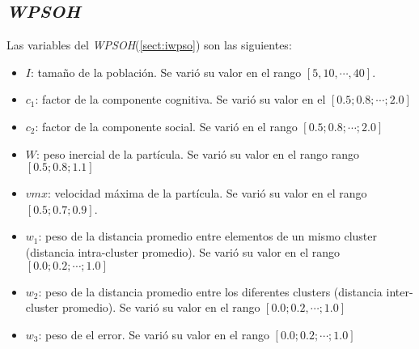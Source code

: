         
        
        

        
        
        

    \subsection{\emph{WPSOH}}\label{sect:awpso}

        Las variables del \emph{WPSOH}(\ref{sect:iwpso}) son las siguientes:
        \begin{itemize}
            \item $I$: tamaño de la población. Se varió su valor en el rango
        $[5, 10, \cdots, 40]$.
            \item $c_1$: factor de la componente cognitiva. Se varió su valor en el
        $[0.5; 0.8; \cdots; 2.0]$
            \item $c_2$: factor de la componente social. Se varió en el rango
        $[0.5; 0.8; \cdots; 2.0]$
            \item $W$: peso inercial de la partícula. Se varió su valor en el rango
        rango $[0.5; 0.8; 1.1]$
            \item $vmx$: velocidad máxima de la partícula. Se varió su valor en el rango
        $[0.5; 0.7; 0.9]$.
	        \item $w_1$: peso de la distancia promedio entre elementos de un
        mismo cluster (distancia intra-cluster promedio). Se varió su valor en el rango
        $[0.0; 0.2; \cdots; 1.0]$
	        \item $w_2$: peso de la distancia promedio entre los diferentes
        clusters (distancia inter-cluster promedio). Se varió su valor en el rango
        $[0.0; 0.2, \cdots; 1.0]$
	        \item $w_3$: peso de el error. Se varió su valor en el rango
        $[0.0; 0.2; \cdots; 1.0]$
        \end{itemize}

        \begin{landscape}

        
        
        

        \end{landscape}

